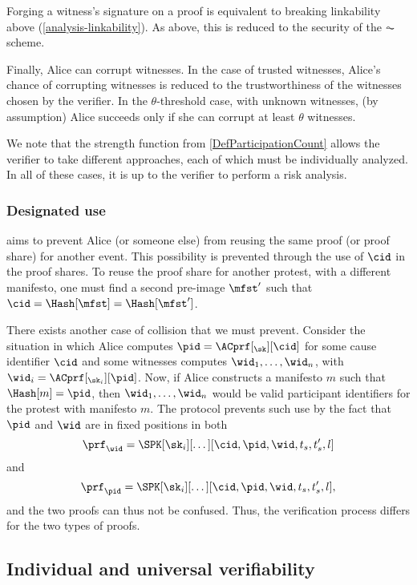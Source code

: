 Forging a witness's signature on a proof is equivalent to breaking linkability 
above (\cref{analysis-linkability}).
As above, this is reduced to the security of the \(\AC\) scheme.

Finally, Alice can corrupt witnesses.
In the case of trusted witnesses, Alice's chance of corrupting witnesses is 
reduced to the trustworthiness of the witnesses chosen by the verifier.
In the \(\theta\)-threshold case, with unknown witnesses, (by assumption) Alice 
succeeds only if she can corrupt at least \(\theta\) witnesses.

We note that the strength function from \cref{DefParticipationCount} allows the 
verifier to take different approaches, each of which must be individually 
analyzed.
In all of these cases, it is up to the verifier to perform a risk analysis.

\subsubsection{Designated use}%
\label{analysis-designated}

 aims to prevent Alice (or someone else) from reusing the 
same proof (or proof share) for another event.
This possibility is prevented through the use of \(\cid\) in the proof shares.
To reuse the proof share for another protest, with a different manifesto, one 
must find a second pre-image \(\mfst'\) such that \(\cid = \Hash[\mfst] = 
  \Hash[\mfst']\).

There exists another case of collision that we must prevent.
Consider the situation in which Alice computes \(\pid = \ACprf[_\sk][\cid]\) for some cause identifier \(\cid\) and some witnesses computes \(\wid_1, \dotsc, \wid_n\), with \(\wid_i = \ACprf[_{\sk_i}][\pid]\).
Now, if Alice constructs a manifesto \(m\) such that \(\Hash[m] = \pid\), then \(\wid_1, \dotsc, \wid_n\) would be valid participant identifiers for the protest with manifesto \(m\).
The protocol prevents such use by the fact that \(\pid\) and \(\wid\) are in 
fixed positions in both \[
  \prf_{\wid} = \SPK[\sk_i][\dotsc][\cid, \pid, \wid, t_s, t_s', l]
\] and \[
  \prf_{\pid} = \SPK[\sk_i][\dotsc][\cid, \pid, \wid, t_s, t_s', l],
\] and the two proofs can thus not be confused.
Thus, the verification process differs for the two types of proofs.

\subsection{Individual and universal verifiability}%
\label{analysis-individual}%
\label{analysis-universal}

